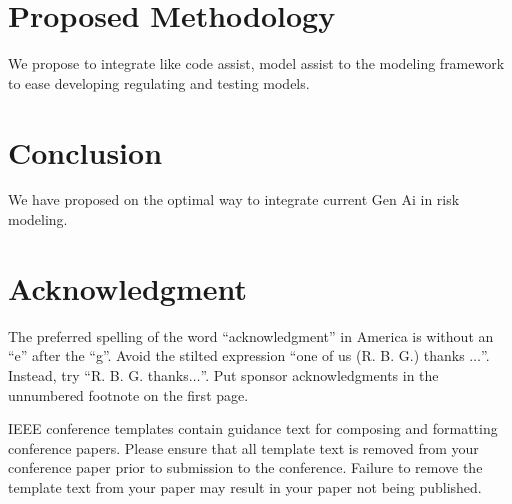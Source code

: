 \documentclass[conference]{IEEEtran}
\begin{document}
\section{Proposed Methodology}
We propose to integrate like code assist, model assist to the modeling framework to ease developing regulating and testing models.

\section{Conclusion}

We have proposed on the optimal way to integrate current Gen Ai in risk modeling.


\section*{Acknowledgment}

The preferred spelling of the word ``acknowledgment'' in America is without 
an ``e'' after the ``g''. Avoid the stilted expression ``one of us (R. B. 
G.) thanks $\ldots$''. Instead, try ``R. B. G. thanks$\ldots$''. Put sponsor 
acknowledgments in the unnumbered footnote on the first page.





\printbibliography  %



\vspace{12pt}
\color{red}
IEEE conference templates contain guidance text for composing and formatting conference papers. Please ensure that all template text is removed from your conference paper prior to submission to the conference. Failure to remove the template text from your paper may result in your paper not being published.
\end{document}
